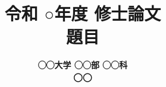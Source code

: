 
\title{
	{\rmfamily\bfseries {\huge 令和 ○年度 修士論文}} \\
	\vspace{1.5cm}
	{\rmfamily\bfseries{\huge 題目}}
	\vspace{2cm}
}

\author{
	\vspace{0.5cm}
	{\rmfamily\bfseries {\huge ◯◯大学 ◯◯部 ◯◯科}} \\
	\vspace{1.0cm}
	{\rmfamily\bfseries {\huge ◯◯}} \\
	\vspace{0.5cm}
	{\rmfamily\bfseries {\huge}}
}

\date{}
